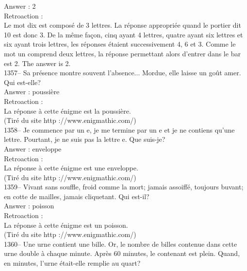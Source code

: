 ﻿\documentclass[letterpaper, 12pt]{article}
\begin{document}
Answer : 2\\

Retroaction : \\
Le mot dix est compos\'e de 3 lettres. La r\'eponse appropri\'ee
quand le portier dit 10 est donc 3. De la m\^eme fa\c con, cinq
ayant 4 lettres, quatre ayant six lettres et six ayant trois
lettres, les r\'eponses \'etaient successivement 4, 6 et 3. Comme le
mot un comprend deux lettres, la r\'eponse permettant alors d'entrer
dans le bar est 2.
The answer is 2.\\

1357--  Sa pr\'esence montre souvent l'absence... Mordue, elle laisse un
go\^ut amer.  Qui est-elle?\\

Answer : poussi\`ere\\

Retroaction : \\
La r\'eponse \`a cette \'enigme est la poussi\`ere.\\
(Tir\'e du site http ://www.enigmathic.com/)\\

1358-- Je commence par un e, je me termine par un e et je ne contiens qu'une
lettre.  Pourtant, je ne suis pas la lettre e. Que suis-je?\\

Answer : enveloppe\\

Retroaction : \\
La r\'eponse \`a cette \'enigme est une enveloppe.\\
(Tir\'e du site http ://www.enigmathic.com/)\\

1359-- Vivant sans souffle, froid comme la mort; jamais assoiff\'e, toujours
buvant; en cotte de mailles, jamais cliquetant. Qui est-il?\\

Answer : poisson\\

Retroaction :\\
La r\'eponse \`a cette \'enigme est un poisson.\\
(Tir\'e du site http ://www.enigmathic.com/)\\

1360--  Une urne contient une bille.  Or, le nombre de billes contenue dans
cette urne double \`a chaque minute. Apr\`es 60 minutes, le contenant est
plein.  Quand, en minutes, l'urne \'etait-elle remplie au quart?\\
\end{document}
